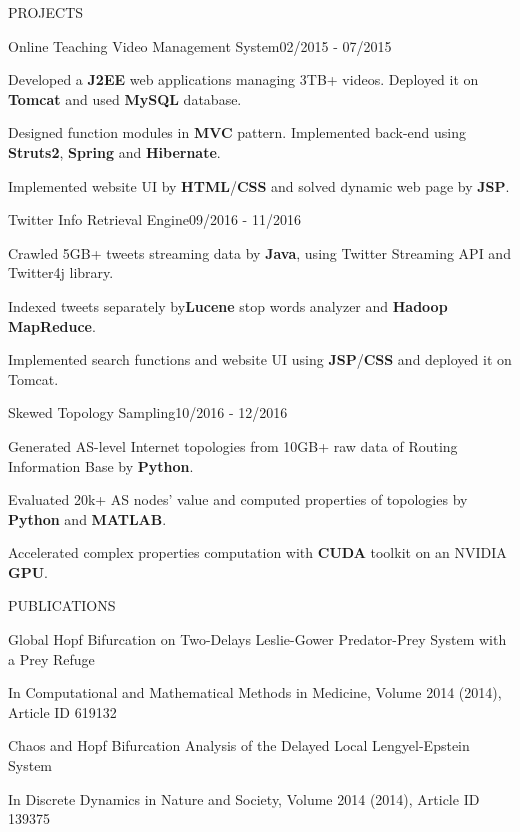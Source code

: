 \documentclass{resume} %
\begin{document}
\begin{rSection}{PROJECTS}
\begin{rSubsection}{Online Teaching Video Management System}{02/2015 - 07/2015}{}{}
\item Developed a {\bf J2EE} web applications managing 3TB+ videos. Deployed it on {\bf Tomcat} and used {\bf MySQL} database.
\item Designed function modules in {\bf MVC} pattern. Implemented back-end using {\bf Struts2}, {\bf Spring} and {\bf Hibernate}.
\item Implemented website UI by {\bf HTML}/{\bf CSS} and solved dynamic web page by {\bf JSP}.
\end{rSubsection}
\begin{rSubsection}{Twitter Info Retrieval Engine}{09/2016 - 11/2016}{}{} 
\item Crawled 5GB+ tweets streaming data by {\bf Java}, using Twitter Streaming API and Twitter4j library. 
\item Indexed tweets separately by{\bf  Lucene} stop words analyzer and {\bf Hadoop} {\bf MapReduce}.
\item Implemented search functions and website UI using {\bf JSP}/{\bf CSS} and deployed it on Tomcat.
\end{rSubsection} 
\begin{rSubsection}{Skewed Topology Sampling}{10/2016 - 12/2016}{}{} 
\item Generated AS-level Internet topologies from 10GB+ raw data of Routing Information Base by {\bf Python}. 
\item Evaluated 20k+ AS nodes’ value and computed properties of topologies by {\bf Python} and {\bf MATLAB}. 
\item Accelerated complex properties computation with {\bf CUDA} toolkit on an NVIDIA {\bf GPU}.
\end{rSubsection} 
\end{rSection} 
\begin{rSection}{PUBLICATIONS} 
\begin{rSubsection}{Global Hopf Bifurcation on Two-Delays Leslie-Gower Predator-Prey System with a Prey Refuge}{} {} {} 
\item In Computational and Mathematical Methods in Medicine, Volume 2014 (2014), Article ID 619132 
\end{rSubsection}
\begin{rSubsection}{Chaos and Hopf Bifurcation Analysis of the Delayed Local Lengyel-Epstein System}{} {} {} 
\item In
Discrete Dynamics in Nature and Society, Volume 2014 (2014), Article ID 139375
\end{rSubsection}
\end{rSection}
\end{document}
